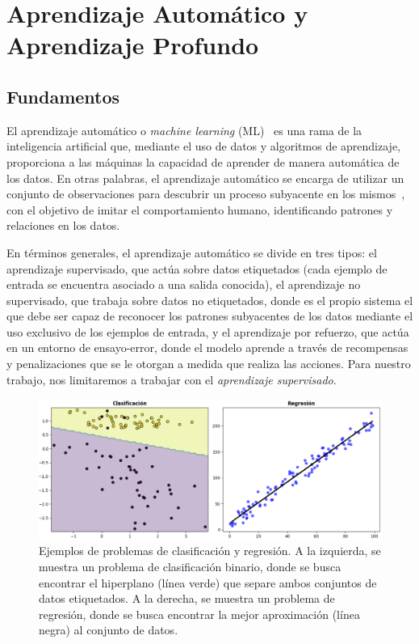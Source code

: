 
\chapter{Aprendizaje Automático y Aprendizaje Profundo}\label{ch:capitulo-aprendizaje-automatico-y-profundo}

\section{Fundamentos}\label{sec:fundamentos-aprendizaje-automatico-y-aprendizaje-profundo}
El aprendizaje automático o \emph{machine learning} (ML)~\cite{Bishop2006, Murphy2022, Murphy2023} es una rama de la inteligencia artificial que, mediante el uso de datos y algoritmos de aprendizaje, proporciona a las máquinas la capacidad de aprender de manera automática de los datos. En otras palabras, el aprendizaje automático se encarga de utilizar un conjunto de observaciones para descubrir un proceso subyacente en los mismos~\cite{Mostafa2012}, con el objetivo de imitar el comportamiento humano, identificando patrones y relaciones en los datos.\newline

En términos generales, el aprendizaje automático se divide en tres tipos: el aprendizaje supervisado, que actúa sobre datos etiquetados (cada ejemplo de entrada se encuentra asociado a una salida conocida), el aprendizaje no supervisado, que trabaja sobre datos no etiquetados, donde es el propio sistema el que debe ser capaz de reconocer los patrones subyacentes de los datos mediante el uso exclusivo de los ejemplos de entrada, y el aprendizaje por refuerzo, que actúa en un entorno de ensayo-error, donde el modelo aprende a través de recompensas y penalizaciones que se le otorgan a medida que realiza las acciones. Para nuestro trabajo, nos limitaremos a trabajar con el \emph{aprendizaje supervisado}.\newline

\begin{figure}[h]
    \centering
    \includegraphics[width=0.8\linewidth]{img/clasi-regresion.png}
    \caption[Ejemplos de problemas de clasificación y regresión.]{Ejemplos de problemas de clasificación y regresión. A la izquierda, se muestra un problema de clasificación binario, donde se busca encontrar el hiperplano (línea verde) que separe ambos conjuntos de datos etiquetados. A la derecha, se muestra un problema de regresión, donde se busca encontrar la mejor aproximación (línea negra) al conjunto de datos.}\label{fig:clasi-regresion}
\end{figure}

